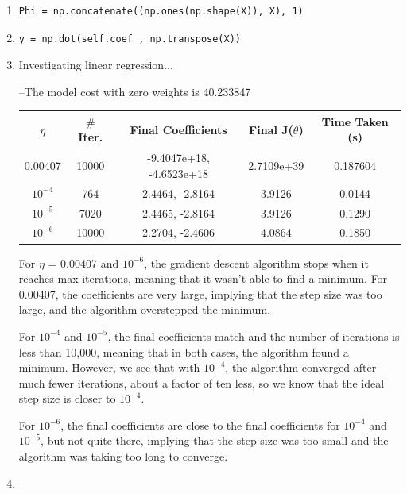 \documentclass[11pt]{article}
\begin{document}
\begin{enumerate}
\item %
\begin{lstlisting}
Phi = np.concatenate((np.ones(np.shape(X)), X), 1)
\end{lstlisting}

\item %
\begin{lstlisting}
y = np.dot(self.coef_, np.transpose(X))
\end{lstlisting}

\item %
Investigating linear regression...

	 --The model cost with zero weights is 40.233847


\begin{center}
\begin{tabular}{ |c|c|c|c|c| } 
 \hline
 $\eta$ & $\#$ Iter. & Final Coefficients & Final J($\theta$) & Time Taken (s)\\ 
 \hline
 0.00407 & 10000 & -9.4047e+18, -4.6523e+18 & 2.7109e+39 & 0.187604\\ 
 $10^{-4}$ & 764 & 2.4464, -2.8164 & 3.9126 & 0.0144\\ 
 $10^{-5}$ & 7020 & 2.4465, -2.8164 & 3.9126 & 0.1290\\ 
 $10^{-6}$ & 10000 & 2.2704, -2.4606 & 4.0864 & 0.1850\\
 \hline
\end{tabular}
\end{center}

For $\eta$ = 0.00407 and $10^{-6}$, the gradient descent algorithm stops when it reaches max iterations, meaning that it wasn't able to find a minimum. For 0.00407, the coefficients are very large, implying that the step size was too large, and the algorithm overstepped the minimum. 

For $10^{-4}$ and $10^{-5}$, the final coefficients match and the number of iterations is less than 10,000, meaning that in both cases, the algorithm found a minimum. However, we see that with $10^{-4}$, the algorithm converged after much fewer iterations, about a factor of ten less, so we know that the ideal step size is closer to $10^{-4}$. 

For $10^{-6}$, the final coefficients are close to the final coefficients for $10^{-4}$ and $10^{-5}$, but not quite there, implying that the step size was too small and the algorithm was taking too long to converge.

\item %


\end{enumerate}
\end{document}
